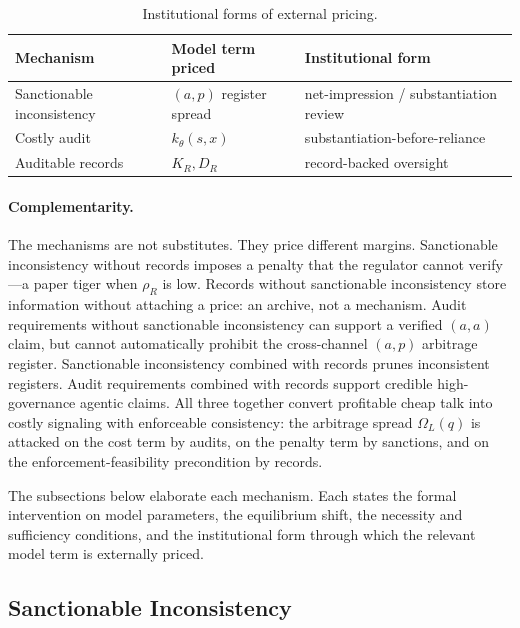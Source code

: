 \documentclass[review,authoryear]{elsarticle}
\theoremstyle{definition}
\theoremstyle{plain}
\begin{document}
\begin{table}[t]
\centering
\footnotesize
\setlength{\tabcolsep}{3pt}
\renewcommand{\arraystretch}{1.2}
\begin{tabular}{@{}p{3.0cm}p{3.0cm}p{4.3cm}@{}}
\toprule
Mechanism & Model term priced & Institutional form \\
\midrule
Sanctionable inconsistency & $(a,p)$ register spread & net-impression / substantiation review \\
Costly audit & $k_\theta(s,x)$ & substantiation-before-reliance \\
Auditable records & $K_R, D_R$ & record-backed oversight \\
\bottomrule
\end{tabular}
\caption{Institutional forms of external pricing.}
\label{tab:institutional-pricing}
\end{table}

\paragraph{Complementarity.}
The mechanisms are not substitutes.  They price different margins.
Sanctionable inconsistency without records imposes a penalty that the regulator
cannot verify---a paper tiger when $\rho_R$ is low.  Records without
sanctionable inconsistency store information without attaching a price:
an archive, not a mechanism.  Audit requirements without sanctionable
inconsistency can support a verified $(a,a)$ claim, but cannot automatically
prohibit the cross-channel $(a,p)$ arbitrage register.  Sanctionable
inconsistency combined with records prunes inconsistent registers.  Audit
requirements combined with records support credible high-governance agentic
claims.  All three together convert profitable cheap talk into costly signaling
with enforceable consistency: the arbitrage spread $\Omega_L(q)$ is attacked on
the cost term by audits, on the penalty term by sanctions, and on the
enforcement-feasibility precondition by records.

The subsections below elaborate each mechanism.  Each states the formal
intervention on model parameters, the equilibrium shift, the necessity and
sufficiency conditions, and the institutional form through which the relevant
model term is externally priced.

\subsection{Sanctionable Inconsistency}
\label{subsec:sanctionable-inconsistency}
\end{document}
